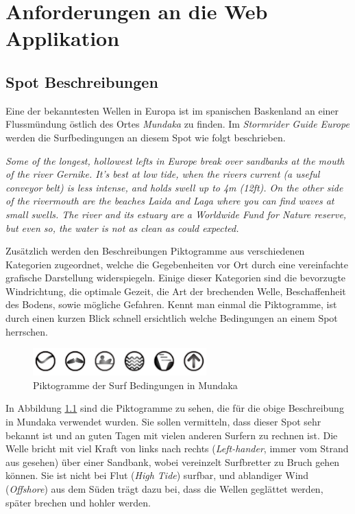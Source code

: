 
\chapter{Anforderungen an die Web Applikation}

\section{Spot Beschreibungen}

Eine der bekanntesten Wellen in Europa ist im spanischen Baskenland an
einer Fluss\-mündung östlich des Ortes \textit{Mundaka} zu finden. Im
\textit{Stormrider Guide Europe} werden die Surfbedingungen an diesem
Spot wie folgt beschrieben.

\textit{Some of the longest, hollowest lefts in Europe break over
  sandbanks at the mouth of the river Gernike. It's best at low tide,
  when the rivers current (a useful conveyor belt) is less intense,
  and holds swell up to 4m (12ft). On the other side of the rivermouth
  are the beaches Laida and Laga where you can find waves at small
  swells. The river and its estuary are a Worldwide Fund for Nature
  reserve, but even so, the water is not as clean as could expected.
} \cite[S.180]{storm_europe_1998}

Zusätzlich werden den Beschreibungen Piktogramme aus verschiedenen
Kategorien zugeordnet, welche die Gegebenheiten vor Ort durch eine
vereinfachte grafische Darstellung widerspiegeln. Einige dieser
Kategorien sind die bevorzugte Windrichtung, die optimale Gezeit, die
Art der brechenden Welle, Beschaffenheit des Bodens, sowie mögliche
Gefahren. Kennt man einmal die Piktogramme, ist durch einen kurzen
Blick schnell ersichtlich welche Bedingungen an einem Spot herrschen.

\begin{figure}[h]
  \begin{center}
    \includegraphics[height=40px]{bilder/mundaka-conditions}
    \caption{Piktogramme der Surf Bedingungen in Mundaka}
    \label{piktogramm}
  \end{center}
\end{figure}

In Abbildung \ref{piktogramm} sind die Piktogramme zu sehen, die für
die obige Beschreibung in Mundaka verwendet wurden. Sie sollen
vermitteln, dass dieser Spot sehr bekannt ist und an guten Tagen mit
vielen anderen Surfern zu rechnen ist. Die Welle bricht mit viel Kraft
von links nach rechts (\textit{Left-hander}, immer vom Strand aus
gesehen) über einer Sandbank, wobei vereinzelt Surfbretter zu Bruch
gehen können.  Sie ist nicht bei Flut (\textit{High Tide}) surfbar,
und ablandiger Wind (\textit{Offshore}) aus dem Süden trägt dazu bei,
dass die Wellen geglättet werden, später brechen und hohler werden.

